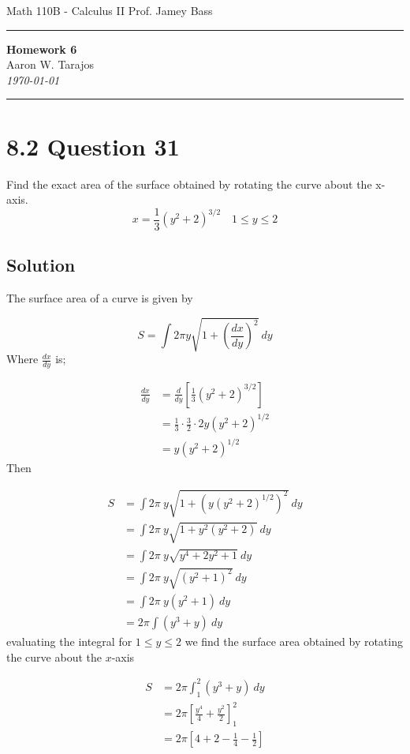 \documentclass{article}
\begin{document}
\noindent
Math 110B - Calculus II  \hfill Prof. Jamey Bass

\noindent\rule{\textwidth}{0.4pt}

\begin{center}
    \textbf{\LARGE Homework 6} \\
    \vspace{12pt}
    \large Aaron W. Tarajos \\
    \textit{\today}
\end{center}

\noindent\rule{\textwidth}{0.4pt}

\section*{8.2 Question 31}
Find the exact area of the surface obtained by rotating the curve about the x-axis.
\[
	x = \frac{1}{3} \left(y^2 +2 \right)^{3/2} \quad 1 \le y \le 2
\]

\subsection*{Solution}
The surface area of a curve is given by

\begin{equation}
	S = \int 2\pi y \sqrt{1 + \left(\frac{dx}{dy} \right)^2} \ dy
\end{equation}
Where $\frac{dx}{dy}$ is;

\begin{align*}
	\frac{dx}{dy} &= \frac{d}{dy} \left[ \frac{1}{3} \left(y^2 + 2 \right)^{3/2} \right] \\
		    &= \frac{1}{3} \cdot \frac{3}{2} \cdot 2y \left(y^2 + 2 \right)^{1/2} \\
		    &= y \left(y^2 + 2 \right)^{1/2}
\end{align*}
Then

\begin{align*}
	S &= \int 2\pi\ y \sqrt{1 + \left( y \left(y^2 + 2 \right)^{1/2} \right)^2}\ dy \\
	  &= \int 2\pi\ y \sqrt{1 + y^2 \left(y^2 + 2 \right)} \ dy \\
	  &= \int 2\pi\ y \sqrt{y^4 + 2y^2 + 1} \ dy \\
	  &= \int 2\pi\ y \sqrt{\left( y^2 + 1 \right)^2} \ dy \\
	  &= \int 2\pi\ y \left(y^2 +1 \right) \ dy \\
	  &= 2\pi \int \left(y^3 + y \right) \ dy
\end{align*}
evaluating the integral for $1 \le y \le 2$ we find the surface area obtained by rotating the curve about the $x$-axis

\begin{align*}
	S &= 2\pi \int_1^2 \left(y^3 + y\right) \ dy \\
	  &= 2\pi \left[ \frac{y^4}{4} + \frac{y^2}{2} \right]_1^2 \\
	  &= \boxed{2\pi \left[ 4 + 2 - \frac{1}{4} - \frac{1}{2}\right]}
\end{align*}
\end{document}
